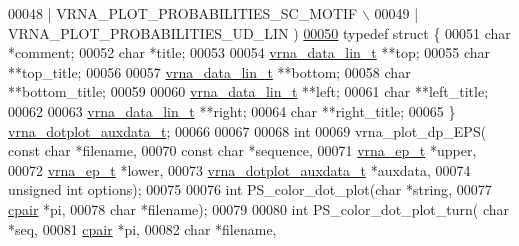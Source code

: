 \begin{DoxyCode}
00048 \textcolor{preprocessor}{                                            | VRNA\_PLOT\_PROBABILITIES\_SC\_MOTIF \(\backslash\)}
00049 \textcolor{preprocessor}{                                            | VRNA\_PLOT\_PROBABILITIES\_UD\_LIN )}
\hyperlink{group__plotting__utils}{00050} \textcolor{keyword}{typedef} \textcolor{keyword}{struct }\{
00051   \textcolor{keywordtype}{char}            *comment;
00052   \textcolor{keywordtype}{char}            *title;
00053 
00054   \hyperlink{group__data__structures_structvrna__data__linear__s}{vrna\_data\_lin\_t} **top;
00055   \textcolor{keywordtype}{char}            **top\_title;
00056 
00057   \hyperlink{group__data__structures_structvrna__data__linear__s}{vrna\_data\_lin\_t} **bottom;
00058   \textcolor{keywordtype}{char}            **bottom\_title;
00059 
00060   \hyperlink{group__data__structures_structvrna__data__linear__s}{vrna\_data\_lin\_t} **left;
00061   \textcolor{keywordtype}{char}            **left\_title;
00062 
00063   \hyperlink{group__data__structures_structvrna__data__linear__s}{vrna\_data\_lin\_t} **right;
00064   \textcolor{keywordtype}{char}            **right\_title;
00065 \} \hyperlink{group__plotting__utils_structvrna__dotplot__auxdata__t}{vrna\_dotplot\_auxdata\_t};
00066 
00067 
00068 \textcolor{keywordtype}{int}
00069 vrna\_plot\_dp\_EPS( \textcolor{keyword}{const} \textcolor{keywordtype}{char}              *filename,
00070                   \textcolor{keyword}{const} \textcolor{keywordtype}{char}              *sequence,
00071                   \hyperlink{group__struct__utils_structvrna__elem__prob__s}{vrna\_ep\_t}               *upper,
00072                   \hyperlink{group__struct__utils_structvrna__elem__prob__s}{vrna\_ep\_t}               *lower,
00073                   \hyperlink{group__plotting__utils_structvrna__dotplot__auxdata__t}{vrna\_dotplot\_auxdata\_t}  *auxdata,
00074                   \textcolor{keywordtype}{unsigned} \textcolor{keywordtype}{int}            options);
00075 
00076 \textcolor{keywordtype}{int} PS\_color\_dot\_plot(\textcolor{keywordtype}{char} *\textcolor{keywordtype}{string},
00077                       \hyperlink{group__data__structures_structvrna__cpair__s}{cpair} *pi,
00078                       \textcolor{keywordtype}{char} *filename);
00079 
00080 \textcolor{keywordtype}{int} PS\_color\_dot\_plot\_turn( \textcolor{keywordtype}{char} *seq,
00081                             \hyperlink{group__data__structures_structvrna__cpair__s}{cpair} *pi,
00082                             \textcolor{keywordtype}{char} *filename,

\end{DoxyCode}
